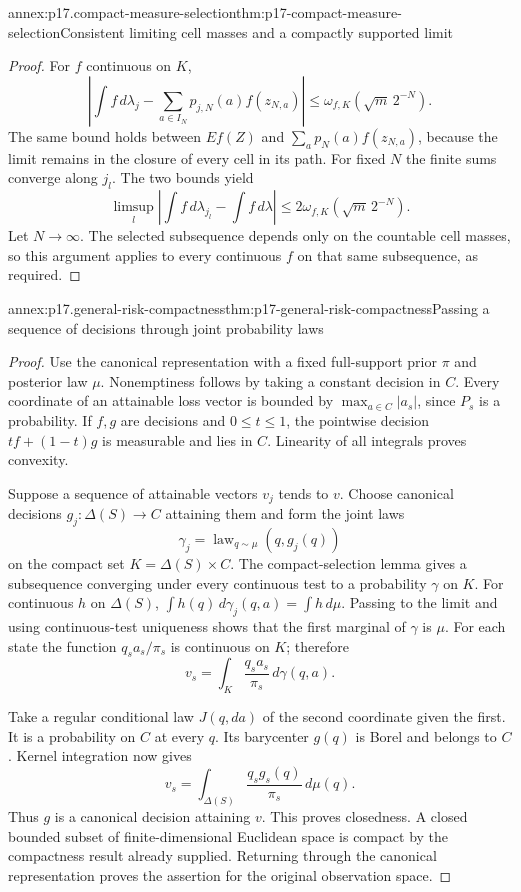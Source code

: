 \begin{annexitem}{annex:p17.compact-measure-selection}{thm:p17-compact-measure-selection}{Consistent limiting cell masses and a compactly supported limit}
\begin{proof}
For \(f\) continuous on \(K\),
\[
 \left|\int f\,d\lambda_j-\sum_{a\in I_N}p_{j,N}(a)f(z_{N,a})\right|
                         \leq\omega_{f,K}(\sqrt m\,2^{-N}).
\]
The same bound holds between \(Ef(Z)\) and
\(\sum_ap_N(a)f(z_{N,a})\), because the limit remains in the
closure of every cell in its path.
For fixed \(N\) the finite sums converge along \(j_l\).
The two bounds yield
\[
 \limsup_l\left|\int f\,d\lambda_{j_l}-\int f\,d\lambda\right|
                    \leq2\omega_{f,K}(\sqrt m\,2^{-N}).
\]
Let \(N\to\infty\).
The selected subsequence depends only on the countable cell masses,
so this argument applies to every continuous \(f\) on that same
subsequence, as required.
\end{proof}
\end{annexitem}

\begin{annexitem}{annex:p17.general-risk-compactness}{thm:p17-general-risk-compactness}{Passing a sequence of decisions through joint probability laws}
\begin{proof}
Use the canonical representation with a fixed full-support prior
\(\pi\) and posterior law \(\mu\).
Nonemptiness follows by taking a constant decision in \(C\).
Every coordinate of an attainable loss vector is bounded by
\(\max_{a\in C}|a_s|\), since \(P_s\) is a probability.
If \(f,g\) are decisions and \(0\leq t\leq1\),
the pointwise decision \(tf+(1-t)g\) is measurable and lies in \(C\).
Linearity of all integrals proves convexity.

Suppose a sequence of attainable vectors \(v_j\) tends to \(v\).
Choose canonical decisions \(g_j:\Delta(S)\to C\) attaining them
and form the joint laws
\[
                     \gamma_j=\operatorname{law}_{q\sim\mu}(q,g_j(q))
\]
on the compact set \(K=\Delta(S)\times C\).
The compact-selection lemma gives a subsequence converging under
every continuous test to a probability \(\gamma\) on \(K\).
For continuous \(h\) on \(\Delta(S)\),
\(\int h(q)\,d\gamma_j(q,a)=\int h\,d\mu\).
Passing to the limit and using continuous-test uniqueness shows
that the first marginal of \(\gamma\) is \(\mu\).
For each state the function \(q_sa_s/\pi_s\) is continuous on \(K\);
therefore
\[
                        v_s=\int_K\frac{q_sa_s}{\pi_s}\,d\gamma(q,a).
\]

Take a regular conditional law \(J(q,da)\) of the second coordinate
given the first. It is a probability on \(C\) at every \(q\).
Its barycenter \(g(q)\) is Borel and belongs to \(C\).
Kernel integration now gives
\[
                         v_s=\int_{\Delta(S)}
                                   \frac{q_sg_s(q)}{\pi_s}\,d\mu(q).
\]
Thus \(g\) is a canonical decision attaining \(v\).
This proves closedness. A closed bounded subset of finite-dimensional
Euclidean space is compact by the compactness result already supplied.
Returning through the canonical representation proves the assertion
for the original observation space.
\end{proof}
\end{annexitem}

